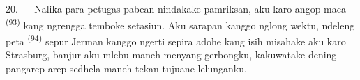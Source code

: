 20. --- Nalika para petugas pabean nindakake pamriksan, aku karo angop
maca  \textsuperscript{(93)} kang ngrengga temboke
setasiun. Aku sarapan kanggo nglong wektu, ndeleng peta 
\textsuperscript{(94)} sepur Jerman kanggo ngerti sepira adohe kang isih
misahake aku karo Strasburg, banjur aku mlebu maneh menyang gerbongku,
kakuwatake dening pangarep-arep sedhela maneh tekan tujuane lelunganku.

\VUsaut{6.0mm}
\VUfilet{22mm}
